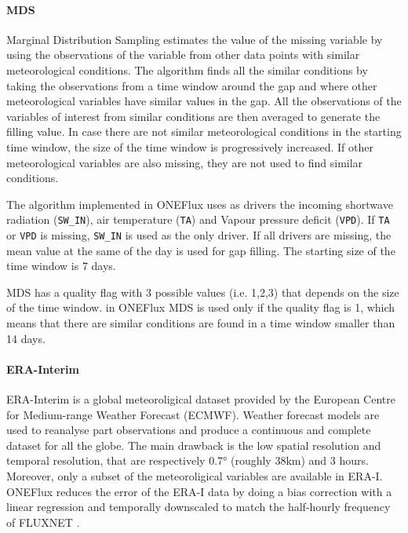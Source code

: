 \documentclass{article}
\begin{document}
\paragraph{MDS} Marginal Distribution Sampling \cite{reichstein_separation_2005-3} estimates the value of the missing variable by using the observations of the variable from other data points with similar meteorological conditions.
The algorithm finds all the similar conditions by taking the observations from a time window around the gap and where other meteorological variables have similar values in the gap.
All the observations of the variables of interest from similar conditions are then averaged to generate the filling value.
In case there are not similar meteorological conditions in the starting time window, the size of the time window is progressively increased. If other meteorological variables are also missing, they are not used to find similar conditions.

The algorithm implemented in ONEFlux uses as drivers the incoming shortwave radiation (\texttt{SW\_IN}), air temperature (\texttt{TA}) and Vapour pressure deficit (\texttt{VPD}). If \texttt{TA} or \texttt{VPD} is missing, \texttt{SW\_IN} is used as the only driver. If all drivers are missing, the mean value at the same of the day is used for gap filling. The starting size of the time window is 7 days.

MDS has a quality flag with 3 possible values (i.e. 1,2,3) that depends on the size of the time window. in ONEFlux MDS is used only if the quality flag is 1, which means that there are similar conditions are found in a time window smaller than 14 days.

\paragraph{ERA-Interim} ERA-Interim is a global meteoroligical dataset provided by the European Centre for Medium-range Weather Forecast (ECMWF). Weather forecast models are used to reanalyse part observations and produce a continuous and complete dataset for all the globe. The main drawback is the low spatial resolution and temporal resolution, that are respectively 0.7° (roughly 38\si{km}) and 3 hours. Moreover, only a subset of the meteoroligical variables are available in ERA-I. ONEFlux reduces the error of the ERA-I data by doing a bias correction with a linear regression and temporally downscaled to match the half-hourly frequency of FLUXNET \cite{vuichard_filling_2015}. 
\end{document}

